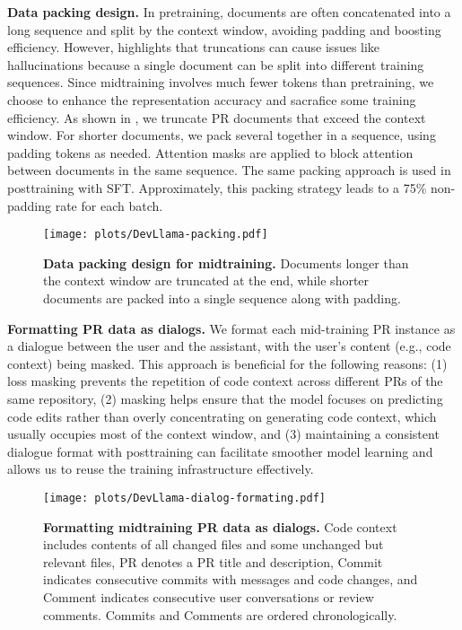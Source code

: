 \textbf{Data packing design.}
In pretraining, documents are often concatenated into a long sequence and split by the context window, avoiding padding and boosting efficiency. However, \citet{fewertruncation} highlights that truncations can cause issues like hallucinations because a single document can be split into different training sequences.
Since midtraining involves much fewer tokens than pretraining, we choose to enhance the representation accuracy and sacrafice some training efficiency.
As shown in , we truncate PR documents that exceed the context window. For shorter documents, we pack several together in a sequence, using padding tokens as needed. Attention masks are applied to block attention between documents in the same sequence.
The same packing approach is used in posttraining with SFT.
Approximately, this packing strategy leads to a 75\% non-padding rate for each batch.


\begin{figure}[htbp]
\centering
\texttt{[image: plots/DevLlama-packing.pdf]}
\caption{\textbf{Data packing design for midtraining.}
Documents longer than the context window are truncated at the end, while shorter documents are packed into a single sequence along with padding.}
\label{fig:packing}
\end{figure}

\textbf{Formatting PR data as dialogs.}
We format each mid-training PR instance as a dialogue between the user and the assistant, with the user's content (e.g., code context) being masked. This approach is beneficial for the following reasons:
(1) loss masking prevents the repetition of code context across different PRs of the same repository,
(2) masking helps ensure that the model focuses on predicting code edits rather than overly concentrating on generating code context, which usually occupies most of the context window,
and (3) maintaining a consistent dialogue format with posttraining can facilitate smoother model learning and allows us to reuse the training infrastructure effectively.

\begin{figure}[htbp]
    \centering
    \texttt{[image: plots/DevLlama-dialog-formating.pdf]}
    \caption{\textbf{Formatting midtraining PR data as dialogs.}
    \textsf{Code context} includes contents of all changed files and some unchanged but relevant files, \textsf{PR} denotes a PR title and description, \textsf{Commit} indicates consecutive commits with messages and code changes, and \textsf{Comment} indicates consecutive \github user conversations or review comments. \textsf{Commit}s and \textsf{Comment}s are ordered chronologically.}

    \label{fig:dialog-formating}
\end{figure}

